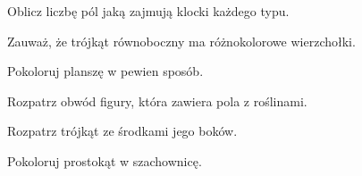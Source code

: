 
\begin{hints_list}
	\item Oblicz liczbę pól jaką zajmują klocki każdego typu.
	\item Zauważ, że trójkąt równoboczny ma różnokolorowe wierzchołki.
	\item Pokoloruj planszę w pewien sposób.
	\item Rozpatrz obwód figury, która zawiera pola z roślinami.
	\item Rozpatrz trójkąt ze środkami jego boków.
	\item Pokoloruj prostokąt w szachownicę.
\end{hints_list}